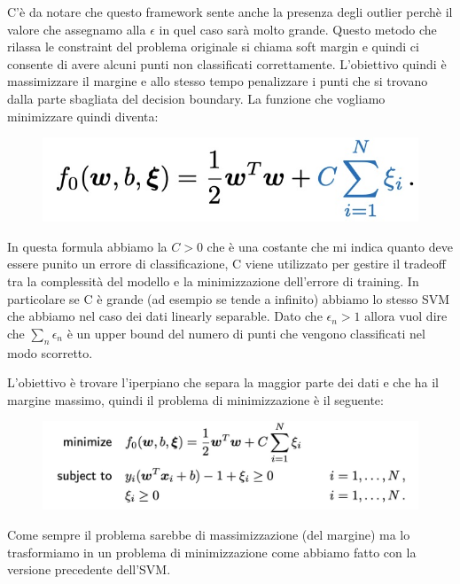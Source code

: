 \documentclass[14pt]{extreport}
\begin{document}
C'è da notare che questo framework sente anche la presenza degli outlier perchè il valore che assegnamo alla $\epsilon$ in quel caso sarà molto
grande. Questo metodo che rilassa le constraint del problema originale si chiama soft margin e quindi ci consente di avere alcuni punti non
classificati correttamente. L'obiettivo quindi è massimizzare il margine e allo stesso tempo penalizzare i punti che si trovano dalla parte sbagliata
del decision boundary. La funzione che vogliamo minimizzare quindi diventa:

\begin{figure}[H]
\centering
\includegraphics[width=0.7\linewidth]{323.jpeg}
\end{figure}

In questa formula abbiamo la $C>0$ che è una costante che mi indica quanto deve essere punito un errore di classificazione, C viene utilizzato per
gestire il tradeoff tra la complessità del modello e la minimizzazione dell'errore di training. In particolare se C è grande (ad esempio se tende a
infinito) abbiamo lo stesso SVM che abbiamo nel caso dei dati linearly separable. Dato che $\epsilon_n > 1$ allora vuol dire che $\sum_n\epsilon_n$ è
un upper bound del numero di punti che vengono classificati nel modo scorretto.
 
 L'obiettivo è trovare l'iperpiano che separa la maggior parte dei dati e che ha il margine massimo, quindi il problema di minimizzazione è il
 seguente:
 
 
\begin{figure}[H]
\centering
\includegraphics[width=0.7\linewidth]{324.jpeg}
\end{figure}

Come sempre il problema sarebbe di massimizzazione (del margine) ma lo trasformiamo in un problema di minimizzazione come abbiamo fatto con la
versione precedente dell'SVM.
\end{document}
